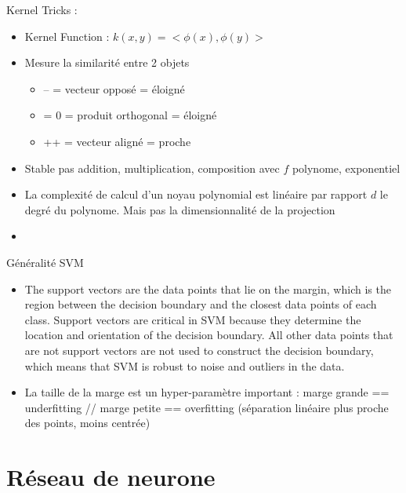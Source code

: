 \documentclass{article}
\theoremstyle{plain}%
\theoremstyle{definition}
\theoremstyle{remark}
\begin{document}
Kernel Tricks : 
\begin{itemize}
    \item Kernel Function : $ k(x,y) = <\phi (x), \phi(y)> $
    \item Mesure la similarité entre 2 objets \begin{itemize}
        \item -- = vecteur opposé = éloigné
        \item = 0 = produit orthogonal = éloigné 
        \item ++ = vecteur aligné = proche
    \end{itemize}
    \item Stable pas addition, multiplication, composition avec $ f $ polynome, exponentiel
    \item La complexité de calcul d'un noyau polynomial est linéaire par rapport $d$ le degré du polynome. Mais pas la dimensionnalité de la projection
    \item 
\end{itemize}

Généralité SVM 
\begin{itemize}
    
    \item  The support vectors are the data points that lie on the margin, which is the region between the decision boundary and the closest data points of each class. Support vectors are critical in SVM because they determine the location and orientation of the decision boundary. All other data points that are not support vectors are not used to construct the decision boundary, which means that SVM is robust to noise and outliers in the data.
    \item La taille de la marge est un hyper-paramètre important : marge grande == underfitting // marge petite == overfitting (séparation linéaire plus proche des points, moins centrée)
\end{itemize}

\section{Réseau de neurone}
\end{document}
